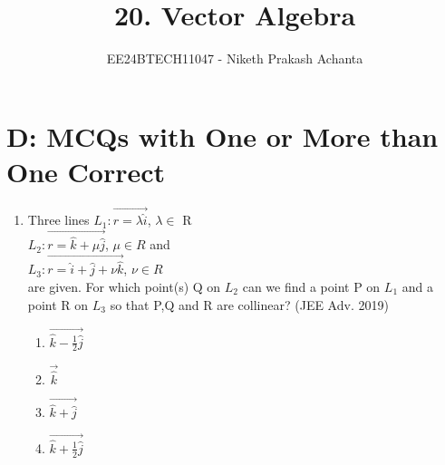\documentclass[journal,12pt,twocolumn]{IEEEtran}
\theoremstyle{remark}
\begin{document}

\vspace{3cm}

\title{20. Vector Algebra}
\author{EE24BTECH11047 - Niketh Prakash Achanta}
\maketitle
\newpage
\bigskip

\renewcommand{\thefigure}{\theenumi}
\renewcommand{\thetable}{\theenumi}
\section{D: MCQs with One or More than One Correct}
\begin{enumerate}
\item %
	Three lines $L_1:\vec{r=\lambda\hat{i}}$, $\lambda\in$ R\\
		$L_2:\vec{r=\hat{k}+\mu\hat{j}}$, $\mu\in R$ and\\
		$L_3:\vec{r=\hat{i}+\hat{j}+\nu\hat{k}}$, $\nu\in R$\\
	are given. For which point(s) Q on $L_2$ can we find a point P on $L_1$ and a point R on $L_3$ so that P,Q and R are collinear? \hfill{(JEE Adv. 2019)}\\
  \begin{enumerate}
	  \item $\vec{\hat{k}-\frac{1}{2}\hat{j}}$
	  \item $\vec{\hat{k}}$
	  \item $\vec{\hat{k}+\hat{j}}$
	  \item $\vec{\hat{k}+\frac{1}{2}\hat{j}}$
   \end{enumerate}
\end{enumerate}	
\end{document}
